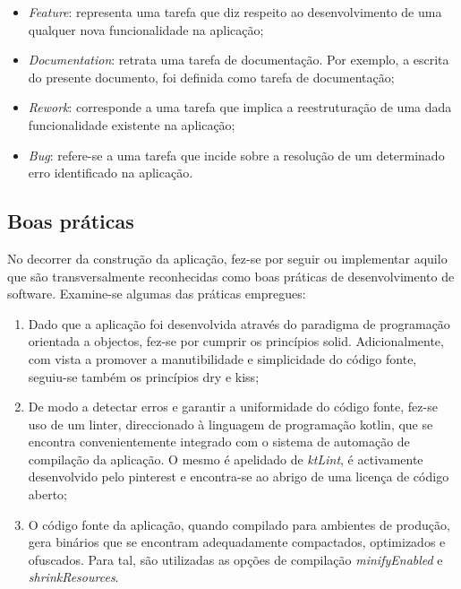 \documentclass[12pt]{report}
\begin{document}
\begin{itemize}
    \item \emph{Feature}: representa uma tarefa que diz respeito ao desenvolvimento de uma qualquer nova funcionalidade na aplicação;
    
    \item \emph{Documentation}: retrata uma tarefa de documentação. Por exemplo, a escrita do presente documento, foi definida como tarefa de documentação;
    
    \item \emph{Rework}: corresponde a uma tarefa que implica a reestruturação de uma dada funcionalidade existente na aplicação;
    
    \item \emph{Bug}: refere-se a uma tarefa que incide sobre a resolução de um determinado erro identificado na aplicação.
\end{itemize}

\clearpage

\subsection{Boas práticas}

No decorrer da construção da aplicação, fez-se por seguir ou implementar aquilo que são transversalmente reconhecidas como boas práticas de desenvolvimento de software. Examine-se algumas das práticas empregues:

\begin{enumerate}
    \item Dado que a aplicação foi desenvolvida através do paradigma de programação orientada a objectos, fez-se por cumprir os princípios \gls{solid}. Adicionalmente, com vista a promover a manutibilidade e simplicidade do código fonte, seguiu-se também os princípios \gls{dry} e \gls{kiss};
    
    \item De modo a detectar erros e garantir a uniformidade do código fonte, fez-se uso de um \gls{linter}, direccionado à linguagem de programação \gls{kotlin}, que se encontra convenientemente integrado com o sistema de automação de compilação da aplicação. O mesmo é apelidado de \textit{ktLint}, é activamente desenvolvido pelo \gls{pinterest} e encontra-se ao abrigo de uma licença de código aberto;
    
    \item O código fonte da aplicação, quando compilado para ambientes de produção, gera binários que se encontram adequadamente compactados, optimizados e ofuscados. Para tal, são utilizadas as opções de compilação \textit{minifyEnabled} e \textit{shrinkResources}.
\end{enumerate}
\end{document}
